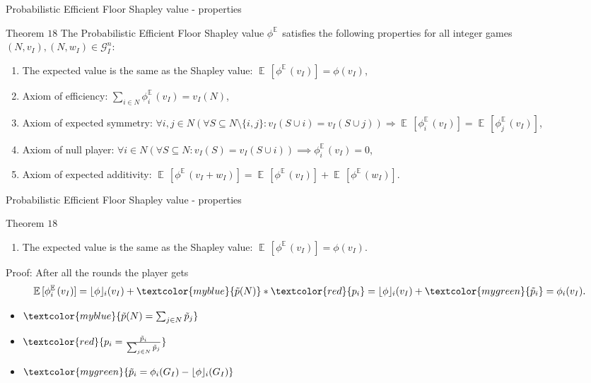 \documentclass{beamer}
\newcommand{\red}[1]{\textcolor{red}{#1}}
\newcommand{\green}[1]{\textcolor{mygreen}{#1}}
\newcommand{\blue}[1]{\textcolor{myblue}{#1}}
\newcommand{\floor}[1]{\left\lfloor #1 \right\rfloor}
\newcommand{\floorphi}{\ensuremath{\floor{\phi}\hspace{-0.5ex}}}
\DeclareMathOperator{\E}{\mathbb{E}\,}
\begin{document}


\begin{frame}{Probabilistic Efficient Floor Shapley value - properties}

    \begin{block}{Theorem $18$}
        The Probabilistic Efficient Floor Shapley value $\phi^{\E}$  satisfies the following properties for all integer games $(N,v_I),(N,w_I) \in \mathcal{G}_I^n$:
        \begin{enumerate}
            \item The expected value is the same as the Shapley value: $\E[\phi^{\E}(v_I)] = \phi(v_I)$,
            \item Axiom of efficiency: $\sum_{i \in N}\phi_{i}^{\E}(v_I) = v_I(N)$,
            \item Axiom of expected symmetry: $\forall i,j \in N (\forall S \subseteq N \setminus \{i,j\}: v_I(S \cup i) = v_I(S \cup j)) \Rightarrow \E[\phi_{i}^{\E}(v_I)] = \E[\phi_{j}^{\E}(v_I)]$,
            \item Axiom of null player: $\forall i \in N(\forall S \subseteq N: v_I(S)=v_I(S \cup i)) \implies \phi_{i}^{\E}(v_I) = 0$,
            \item Axiom of expected additivity: $\E[\phi^{\E}(v_I+w_I)] = \E[\phi^{\E}(v_I)] + \E[\phi^{\E}(w_I)]$.
        \end{enumerate}
    \end{block}

\end{frame}



\begin{frame}{Probabilistic Efficient Floor Shapley value - properties}
    \begin{block}{Theorem $18$}
        \begin{enumerate}
            \item The expected value is the same as the Shapley value: $\E[\phi^{\E}(v_I)] = \phi(v_I)$.
        \end{enumerate}
    \end{block}
    Proof: After all the rounds the player gets
    \begin{displaymath}
        \E[\phi_{i}^{\E}(v_I)] = \floorphi_i(v_I) + \blue{\tilde{p}(N)} * \red{p_i} = \floorphi_i(v_I) + \green{\tilde{p}_i} = \phi_i(v_I).
    \end{displaymath}
    \begin{itemize}
        \item $\blue{\tilde{p}(N) = \sum_{j \in N} \tilde{p}_j}$
        \item $\red{p_i = \frac{\tilde{p}_i}{\sum_{j \in N} \tilde{p}_j}}$
        \item $\green{\tilde{p}_i = \phi_i(G_I) - \floorphi_i(G_I)}$
    \end{itemize}
\end{frame}
\end{document}
